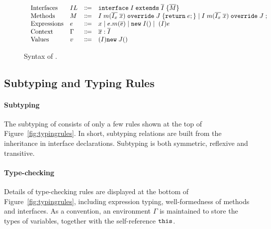 \begin{figure*}[t]
\saveSpaceFig
\begin{displaymath}
\begin{array}{l}
\begin{array}{llrl}
\text{Interfaces}   & IL & \Coloneqq & \texttt{interface} \; I \; \texttt{extends} \; \overline{I} \; {\{} \overline{M} {\}} \\
\text{Methods}      & M  & \Coloneqq & I \; m (\overline{I_x} \; \overline{x}) \; \texttt{override} \; J \; {\{} \texttt{return} \; e ; {\}}  \mid
									   I \; m (\overline{I_x} \; \overline{x}) \; \texttt{override} \; J \; ; \\
\text{Expressions}  & e  & \Coloneqq & x \mid
e.m(\overline{e}) \mid
\texttt{new} \; I() \mid \; (I)e \\
\text{Context}      & \Gamma & \Coloneqq & \overline{x}:\overline{I} \\
\text{Values}       & v & \Coloneqq & (I) \texttt{new} \; J() \\
\end{array}
\end{array}
\end{displaymath}
\caption{Syntax of \name{}.}\label{fig:syntax}
\saveSpaceFig
\end{figure*}

\subsection{Subtyping and Typing Rules}\label{subsec:typingrules}
\paragraph{Subtyping}
The subtyping of \MIM{} consists of only a few rules shown at the top of Figure~\ref{fig:typingrules}.
In short, subtyping relations are built from the inheritance in interface
declarations. Subtyping is both symmetric, reflexive and transitive.

\paragraph{Type-checking}
Details of type-checking rules are displayed at the bottom of Figure~\ref{fig:typingrules}, including expression
typing, well-formedness of methods and interfaces. As a convention, an environment
$\Gamma$ is maintained to store the types of variables, together with
the self-reference $\texttt{this}$.

